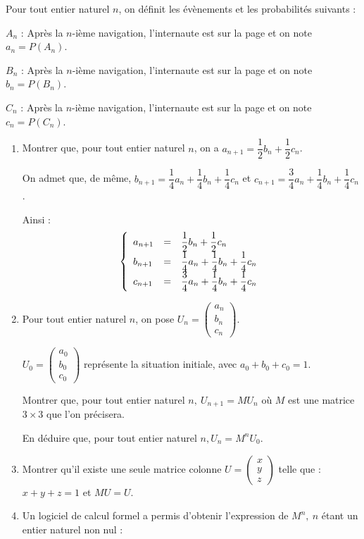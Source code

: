 \documentclass[10pt]{article}
\begin{document}
\medskip

Pour tout entier naturel $n$, on définit les évènements et les probabilités suivants : 

$A_{n}$ : \og Après la $n$-ième navigation, l'internaute est sur la page  \fg{} et on note $a_{n} = P\left(A_{n}\right)$.
 
$B_{n}$ : \og Après la $n$-ième navigation, l'internaute est sur la page  \fg{} et on note $b_{n} = P\left(B_{n}\right)$.
 
$C_{n}$ : \og Après la $n$-ième navigation, l'internaute est sur la page  \fg{} et on note $c_{n} = P\left(C_{n}\right)$.

\medskip
 
\begin{enumerate}
\item Montrer que, pour tout entier naturel $n$, on a $a_{n+1} = \dfrac{1}{2} b_{n} + \dfrac{1}{2}c_{n}$. 

On admet que, de m\^eme, $b_{n+1} = \dfrac{1}{4}a_{n} + \dfrac{1}{4}b_{n} + \dfrac{1}{4}c_{n}$ et $c_{n+1} = \dfrac{3}{4}a_{n} + \dfrac{1}{4}b_{n} + \dfrac{1}{4}c_{n}$. 

Ainsi : 
\renewcommand\arraystretch{1.8}
\[\left\{\begin{array}{l c l}
a_{n+1} &=& \dfrac{1}{2} b_{n} + \dfrac{1}{2}c_{n}\\
b_{n+1} &=& \dfrac{1}{4}a_{n} + \dfrac{1}{4}b_{n} + \dfrac{1}{4}c_{n}\\
c_{n+1} &=& \dfrac{3}{4}a_{n} + \dfrac{1}{4}b_{n} + \dfrac{1}{4}c_{n}
\end{array}\right.\]
\renewcommand\arraystretch{1}
 
\item Pour tout entier naturel $n$, on pose $U_{n} = \begin{pmatrix} a_{n}\\b_{n}\\c_{n}\end{pmatrix}$.
 
$U_{0} = \begin{pmatrix} a_{0}\\b_{0}\\c_{0}\end{pmatrix}$ représente la situation initiale, avec $a_{0} + b_{0} + c_{0} = 1$.
 
Montrer que, pour tout entier naturel $n,\: U_{n+1} = MU_{n}$ où $M$ est une matrice $3 \times 3$ que l'on précisera.
 
En déduire que, pour tout entier naturel $n, U_{n} = M^nU_{0}$. 
\item Montrer qu'il existe une seule matrice colonne $U =\begin{pmatrix}x\\y\\z\end{pmatrix}$ telle que : $x + y + z = 1$ et $MU = U$. 
\item Un logiciel de calcul formel a permis d'obtenir l'expression de $M^n,\: n$ étant un entier naturel non nul :


\end{enumerate}
\end{document}

